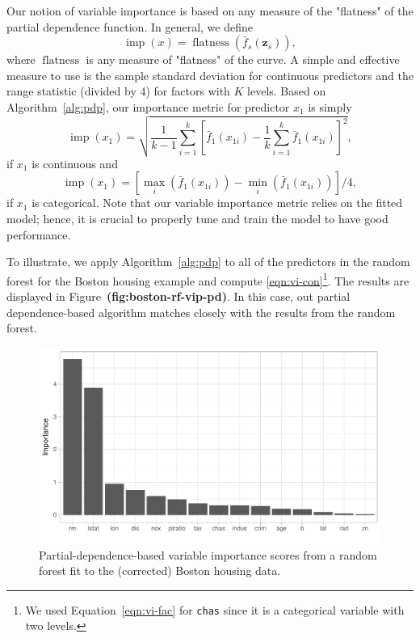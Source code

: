 \documentclass[12pt]{article}
\def\code#1{\texttt{#1}}
\def\ref#1{\textbf{(#1)}}
\DeclareMathOperator{\flatness}{flatness}
\DeclareMathOperator{\imp}{imp}
\begin{document}
Our notion of variable importance is based on any measure of the "flatness" of the partial dependence function. In general, we define
\begin{equation*}
  \imp\left(x\right) = \flatness\left(\bar{f}_s\left(\boldsymbol{z}_s\right)\right),
\end{equation*}
where $\flatness$ is any measure of "flatness" of the curve. A simple and effective measure to use is the sample standard deviation for continuous predictors and the range statistic (divided by 4) for factors with $K$ levels. Based on Algorithm~\eqref{alg:pdp}, our importance metric for predictor $x_1$ is simply
\begin{equation}
\label{eqn:vi-con}
  \imp\left(x_1\right) = \sqrt{\frac{1}{k - 1}\sum_{i = 1}^k\left[\bar{f}_1\left(x_{1i}\right) - \frac{1}{k}\sum_{i = 1}^k\bar{f}_1\left(x_{1i}\right)\right] ^ 2},
\end{equation}
if $x_1$ is continuous and
\begin{equation}
\label{eqn:vi-fac}
  \imp\left(x_1\right) = \left[\max_i\left(\bar{f}_1\left(x_{1i}\right)\right) - \min_i\left(\bar{f}_1\left(x_{1i}\right)\right)\right] / 4,
\end{equation}
if $x_1$ is categorical. Note that our variable importance metric relies on the fitted model; hence, it is crucial to properly tune and train the model to have good performance.

To illustrate, we apply Algorithm~\eqref{alg:pdp} to all of the predictors in the random forest for the Boston housing example and compute \eqref{eqn:vi-con}\footnote{We used Equation~\eqref{eqn:vi-fac} for \code{chas} since it is a categorical variable with two levels.}. The results are displayed in Figure~\ref{fig:boston-rf-vip-pd}. In this case, out partial dependence-based algorithm matches closely with the results from the random forest.

\begin{figure}[!htb]
  \centering
  \includegraphics[width=1.0\textwidth]{boston-rf-vip-pd}
  \caption{Partial-dependence-based variable importance scores from a random forest fit to the (corrected) Boston housing data. \label{fig:boston-rf-vip-pd}}
\end{figure}
\end{document}
